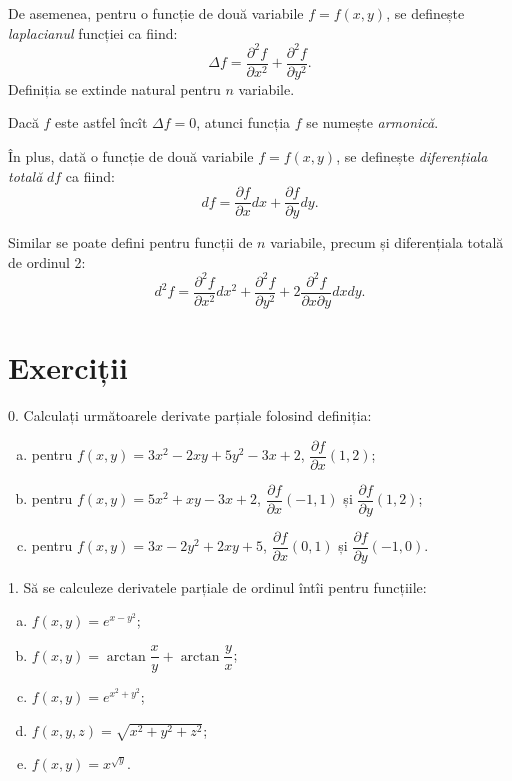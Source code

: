 De asemenea, pentru o funcție de două variabile $ f = f(x, y) $, se definește
\emph{laplacianul} funcției ca fiind:
\[
  \Delta f = \frac{\partial^2 f}{\partial x^2} + \frac{\partial^2 f}{\partial y^2}.
\]
Definiția se extinde natural pentru $ n $ variabile.

Dacă $ f $ este astfel încît $ \Delta f = 0 $, atunci funcția $ f $
se numește \emph{armonică}.  

În plus, dată o funcție de două variabile $ f = f(x, y) $, se definește
\emph{diferențiala totală} $ df $ ca fiind:
\[
  df = \frac{\partial f}{\partial x} dx + \frac{\partial f}{\partial y} dy.
\]

Similar se poate defini pentru funcții de $ n $ variabile, precum și
diferențiala totală de ordinul 2:
\[
  d^2 f = \frac{\partial^2 f}{\partial x^2} dx^2 + \frac{\partial^2 f}{\partial y^2} + %
  2 \frac{\partial^2 f}{\partial x \partial y} dxdy.
\]


\section{Exerciții}

0. Calculați următoarele derivate parțiale folosind definiția:
\begin{enumerate}[(a)]
\item pentru $ f(x, y) = 3x^2 - 2xy + 5y^2 - 3x + 2 $, $ \dfrac{\partial f}{\partial x}(1, 2) $;
\item pentru $ f(x, y) = 5x^2 + xy - 3x + 2 $, $ \dfrac{\partial f}{\partial x}(-1, 1) $ și
  $ \dfrac{\partial f}{\partial y}(1, 2) $;
\item pentru $ f(x, y) = 3x - 2y^2 + 2xy + 5 $, $ \dfrac{\partial f}{\partial x}(0, 1) $ și
  $ \dfrac{\partial f}{\partial y}(-1, 0) $.
\end{enumerate}

1. Să se calculeze derivatele parțiale de ordinul întîi pentru funcțiile:
\begin{enumerate}[(a)]
\item $ f(x, y) = e^{x - y^2} $;
\item $ f(x, y) = \arctan \dfrac{x}{y} + \arctan \dfrac{y}{x} $;
\item $ f(x, y) = e^{x^2 + y^2} $;
\item $ f(x, y, z) = \sqrt{x^2  + y^2 + z^2} $;
\item $ f(x, y) = x^{\sqrt{y}} $.
\end{enumerate}

